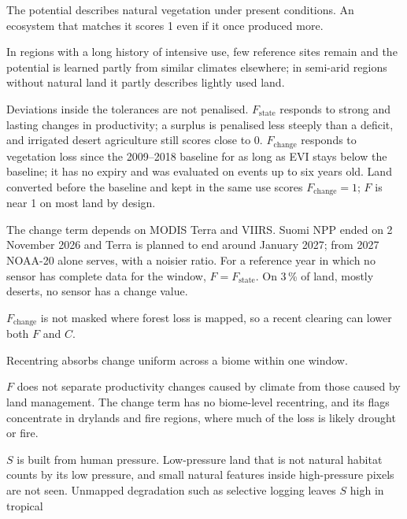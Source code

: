 \documentclass[11pt,a4paper]{article}
\begin{document}
\begin{description}[leftmargin=1.2em]
\item[Contemporary reference.] The potential describes natural vegetation under present
conditions. An ecosystem that matches it scores 1 even if it once produced more.
\item[Extrapolation.] In regions with a long history of intensive use, few reference sites
remain and the potential is learned partly from similar climates elsewhere; in semi-arid regions
without natural land it partly describes lightly used land.
\item[Detection limits of $F$.] Deviations inside the tolerances are not penalised.
$F_{\text{state}}$ responds to strong and lasting changes in productivity; a surplus is penalised
less steeply than a deficit, and irrigated desert agriculture still scores close to 0.
$F_{\text{change}}$ responds to vegetation loss since the 2009--2018 baseline for as long as EVI
stays below the baseline; it has no expiry and was evaluated on events up to six years old. Land converted before the baseline and kept in
the same use scores $F_{\text{change}} = 1$; $F$ is near 1 on most land by design.
\item[Ending satellite records.] The change term depends on MODIS Terra and VIIRS. Suomi NPP
ended on 2 November 2026 and Terra is planned to end around January 2027; from 2027 NOAA-20 alone
serves, with a noisier ratio. For a reference year in which no sensor has complete data for the
window, $F = F_{\text{state}}$. On 3\,\% of land, mostly deserts, no sensor has a change value.
\item[Shared response to clearing.] $F_{\text{change}}$ is not masked where forest loss is
mapped, so a recent clearing can lower both $F$ and $C$.
\item[Absorbed biome-wide change.] Recentring absorbs change uniform across a biome within one
window.
\item[Climate versus management.] $F$ does not separate productivity changes caused by climate
from those caused by land management. The change term has no biome-level recentring, and its flags
concentrate in drylands and fire regions, where much of the loss is likely drought or fire.
\item[Pressure, not habitat.] $S$ is built from human pressure. Low-pressure land that is not
natural habitat counts by its low pressure, and small natural features inside high-pressure
pixels are not seen. Unmapped degradation such as selective logging leaves $S$ high in tropical

\end{description}
\end{document}
